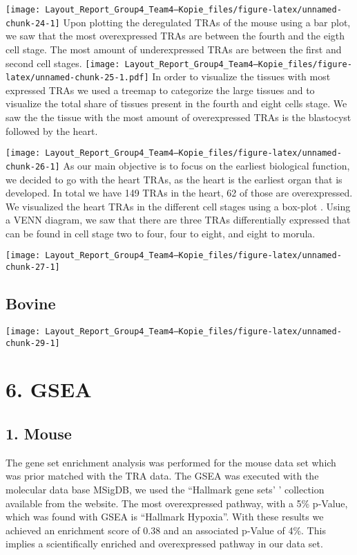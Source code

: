 \documentclass[
  parskip,
  oneside]{scrreprt}
\begin{document}
\texttt{[image: Layout\_Report\_Group4\_Team4---Kopie\_files/figure-latex/unnamed-chunk-24-1]}
Upon plotting the deregulated TRAs of the mouse using a bar plot, we saw
that the most overexpressed TRAs are between the fourth and the eigth
cell stage. The most amount of underexpressed TRAs are between the first
and second cell stages.
\texttt{[image: Layout\_Report\_Group4\_Team4---Kopie\_files/figure-latex/unnamed-chunk-25-1.pdf]}
In order to visualize the tissues with most expressed TRAs we used a
treemap to categorize the large tissues and to visualize the total share
of tissues present in the fourth and eight cells stage. We saw the the
tissue with the most amount of overexpressed TRAs is the blastocyst
followed by the heart.

\texttt{[image: Layout\_Report\_Group4\_Team4---Kopie\_files/figure-latex/unnamed-chunk-26-1]}
As our main objective is to focus on the earliest biological function,
we decided to go with the heart TRAs, as the heart is the earliest organ
that is developed. In total we have 149 TRAs in the heart, 62 of those
are overexpressed. We visualized the heart TRAs in the different cell
stages using a box-plot . Using a VENN diagram, we saw that there are
three TRAs differentially expressed that can be found in cell stage two
to four, four to eight, and eight to morula.

\texttt{[image: Layout\_Report\_Group4\_Team4---Kopie\_files/figure-latex/unnamed-chunk-27-1]}

\hypertarget{bovine-2}{%
\subsection{Bovine}\label{bovine-2}}

\texttt{[image: Layout\_Report\_Group4\_Team4---Kopie\_files/figure-latex/unnamed-chunk-29-1]}

\hypertarget{gsea}{%
\section{6. GSEA}\label{gsea}}

\hypertarget{mouse-2}{%
\subsection{1. Mouse}\label{mouse-2}}

The gene set enrichment analysis was performed for the mouse data set
which was prior matched with the TRA data. The GSEA was executed with
the molecular data base MSigDB, we used the ``Hallmark gene sets' '
collection available from the website. The most overexpressed pathway,
with a 5\% p-Value, which was found with GSEA is ``Hallmark Hypoxia''.
With these results we achieved an enrichment score of 0.38 and an
associated p-Value of 4\%. This implies a scientifically enriched and
overexpressed pathway in our data set.
\end{document}

